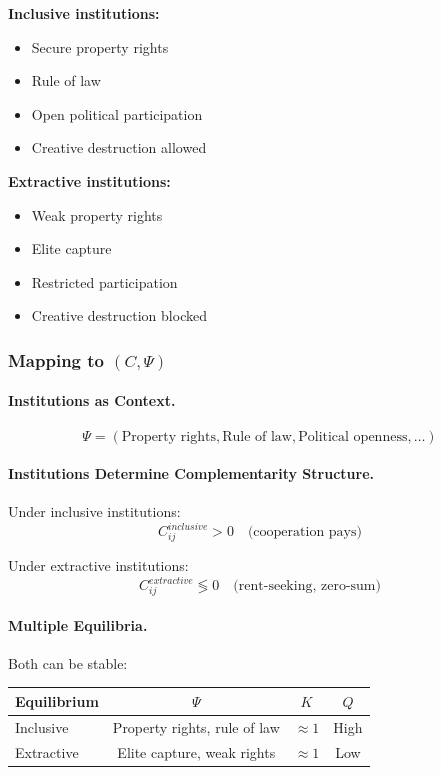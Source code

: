 \documentclass[12pt,a4paper]{article}
\begin{document}
\textbf{Inclusive institutions:}
\begin{itemize}
  \item Secure property rights
  \item Rule of law
  \item Open political participation
  \item Creative destruction allowed
\end{itemize}

\textbf{Extractive institutions:}
\begin{itemize}
  \item Weak property rights
  \item Elite capture
  \item Restricted participation
  \item Creative destruction blocked
\end{itemize}

\subsubsection{Mapping to $(C, \Psi)$}

\paragraph{Institutions as Context.}
\begin{equation}
  \Psi = (\text{Property rights}, \text{Rule of law}, \text{Political openness}, \ldots)
\end{equation}

\paragraph{Institutions Determine Complementarity Structure.}
Under inclusive institutions:
\begin{equation}
  C_{ij}^{inclusive} > 0 \quad \text{(cooperation pays)}
\end{equation}

Under extractive institutions:
\begin{equation}
  C_{ij}^{extractive} \lessgtr 0 \quad \text{(rent-seeking, zero-sum)}
\end{equation}

\paragraph{Multiple Equilibria.}
Both can be stable:
\begin{center}
\renewcommand{\arraystretch}{1.2}
\begin{tabular}{lccc}
\hline
\textbf{Equilibrium} & $\Psi$ & $K$ & $Q$ \\
\hline
Inclusive & Property rights, rule of law & $\approx 1$ & High \\
Extractive & Elite capture, weak rights & $\approx 1$ & Low \\
\hline
\end{tabular}
\end{center}
\end{document}
